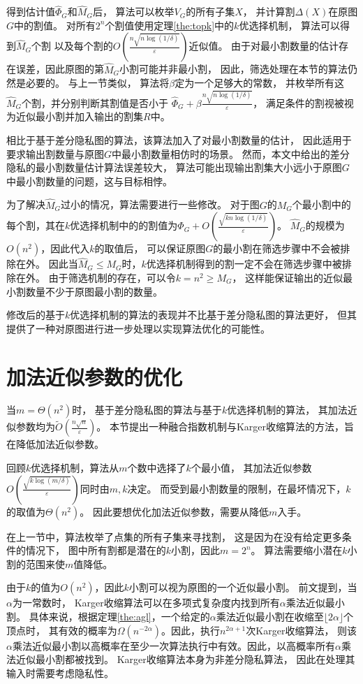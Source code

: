 得到估计值$\hat\Phi_G$和$\hat M_G$后，
算法可以枚举$V_G$的所有子集$X$，
并计算割$\Delta(X)$在原图$G$中的割值。
对所有$2^n$个割值使用定理\ref{the:topk}中的$k$优选择机制，
算法可以得到$\hat M_G$个割
以及每个割的$O(\frac{n\sqrt{n\log(1/\delta)}}{\varepsilon})$近似值。
由于对最小割数量的估计存在误差，因此原图的第$\hat M_G$小割可能并非最小割，
因此，筛选处理在本节的算法仍然是必要的。
与上一节类似，
算法将$\beta$定为一个足够大的常数，
并枚举所有这$\hat M_G$个割，并分别判断其割值是否小于
$\hat \Phi_G+\beta \frac{n\sqrt{n\log(1/\delta)}}{\varepsilon}$，
满足条件的割视被视为近似最小割并加入输出的割集$R$中。

相比于基于差分隐私图的算法，该算法加入了对最小割数量的估计，
因此适用于要求输出割数量与原图$G$中最小割数量相仿时的场景。
然而，本文中给出的差分隐私的最小割数量估计算法误差较大，
算法可能出现输出割集大小远小于原图$G$中最小割数量的问题，这与目标相悖。

为了解决$\hat M_G$过小的情况，算法需要进行一些修改。
对于图$G$的$M_G$个最小割中的每个割，其在$k$优选择机制中的的割值为$\Phi_G+O(\frac{\sqrt{kn\log(1/\delta)}}{\varepsilon})$。
$\hat M_G$的规模为$O(n^2)$，因此代入$k$的取值后，
可以保证原图$G$的最小割在筛选步骤中不会被排除在外。
因此当$\hat M_G\leq M_G$时，$k$优选择机制得到的割一定不会在筛选步骤中被排除在外。
由于筛选机制的存在，可以令$k=n^2\geq M_G$，
这样能保证输出的近似最小割数量不少于原图最小割的数量。

修改后的基于$k$优选择机制的算法的表现并不比基于差分隐私图的算法更好，
但其提供了一种对原图进行进一步处理以实现算法优化的可能性。

\section{加法近似参数的优化}

当$m=\Theta (n^2)$时，
基于差分隐私图的算法与基于$k$优选择机制的算法，
其加法近似参数均为$\tilde O(\frac{n\sqrt n}{\varepsilon})$。
本节提出一种融合指数机制与Karger收缩算法的方法，旨在降低加法近似参数。

回顾$k$优选择机制，算法从$m$个数中选择了$k$个最小值，
其加法近似参数$O(\frac{\sqrt{k\log(m/\delta)}}{\varepsilon})$同时由$m,k$决定。
而受到最小割数量的限制，在最坏情况下，$k$的取值为$\Theta (n^2)$。
因此要想优化加法近似参数，需要从降低$m$入手。

在上一节中，算法枚举了点集的所有子集来寻找割，
这是因为在没有给定更多条件的情况下，
图中所有割都是潜在的$k$小割，因此$m=2^n$。
算法需要缩小潜在$k$小割的范围来使$m$值降低。

由于$k$的值为$O(n^2)$，因此$k$小割可以视为原图的一个近似最小割。
前文提到，当$\alpha$为一常数时，
Karger收缩算法可以在多项式复杂度内找到所有$\alpha$乘法近似最小割。
具体来说，根据定理\ref{the:agl}，一个给定的$\alpha$乘法近似最小割在收缩至$\lfloor2\alpha\rfloor$个顶点时，
其有效的概率为$\Omega(n^{-2\alpha})$。因此，执行$n^{2\alpha+1}$次Karger收缩算法，
则该$\alpha$乘法近似最小割以高概率在至少一次算法执行中有效。因此，以高概率所有$\alpha$乘法近似最小割都被找到。
Karger收缩算法本身为非差分隐私算法，
因此在处理其输入时需要考虑隐私性。


